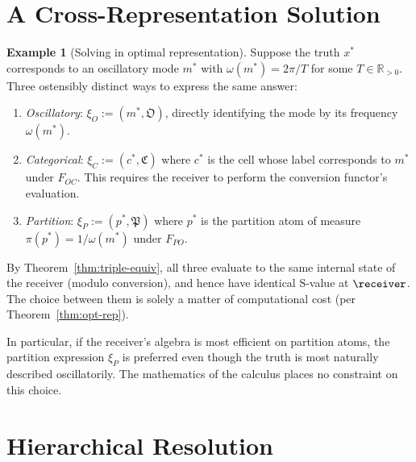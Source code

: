 \documentclass[11pt,a4paper]{article}
\theoremstyle{thmstyle}
\theoremstyle{thmstyle}
\theoremstyle{definition}
\newtheorem{example}[theorem]{Example}
\theoremstyle{remark}
\newcommand{\Real}{\mathbb{R}}
\begin{document}
\section{A Cross-Representation Solution}
\label{sec:cross-rep-example}

\begin{example}[Solving in optimal representation]
\label{ex:opt-rep}
Suppose the truth $x^{*}$ corresponds to an
oscillatory mode $m^{*}$ with $\omega(m^{*}) =
2\pi/T$ for some $T \in \Real_{>0}$.  Three
ostensibly distinct ways to express the same answer:
\begin{enumerate}[nosep,label=(\arabic*)]
\item \emph{Oscillatory}: $\xi_{O} := (m^{*}, \mathfrak{O})$,
      directly identifying the mode by its frequency
      $\omega(m^{*})$.
\item \emph{Categorical}: $\xi_{C} := (c^{*},
      \mathfrak{C})$ where $c^{*}$ is the cell whose
      label corresponds to $m^{*}$ under
      $F_{OC}$.  This requires the receiver to
      perform the conversion functor's evaluation.
\item \emph{Partition}: $\xi_{P} := (p^{*},
      \mathfrak{P})$ where $p^{*}$ is the partition
      atom of measure $\pi(p^{*}) = 1/\omega(m^{*})$
      under $F_{PO}$.
\end{enumerate}

By Theorem~\ref{thm:triple-equiv}, all three
evaluate to the same internal state of the receiver
(modulo conversion), and hence have identical
S-value at $\receiver$.  The choice between them is
solely a matter of computational cost (per
Theorem~\ref{thm:opt-rep}).

In particular, if the receiver's algebra is most
efficient on partition atoms, the partition
expression $\xi_{P}$ is preferred even though the
truth is most naturally described oscillatorily.
The mathematics of the calculus places no constraint
on this choice.
\end{example}

\section{Hierarchical Resolution}
\label{sec:hierarchical-example}
\end{document}
